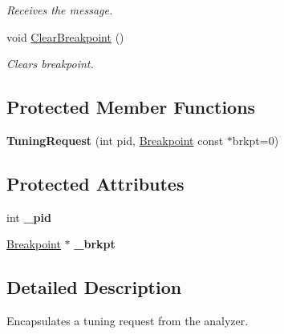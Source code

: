 \begin{DoxyCompactItemize}
\begin{DoxyCompactList}\small\item\em Receives the message. \end{DoxyCompactList}\item 
\hypertarget{class_common_1_1_tuning_request_a8a83c67314d30a6b78fd7510219c3a01}{void \hyperlink{class_common_1_1_tuning_request_a8a83c67314d30a6b78fd7510219c3a01}{Clear\-Breakpoint} ()}\label{class_common_1_1_tuning_request_a8a83c67314d30a6b78fd7510219c3a01}

\begin{DoxyCompactList}\small\item\em Clears breakpoint. \end{DoxyCompactList}\end{DoxyCompactItemize}
\subsection*{Protected Member Functions}
\begin{DoxyCompactItemize}
\item 
\hypertarget{class_common_1_1_tuning_request_a77112081462dd30e0dc053a6c1d58eb4}{{\bfseries Tuning\-Request} (int pid, \hyperlink{class_common_1_1_breakpoint}{Breakpoint} const $\ast$brkpt=0)}\label{class_common_1_1_tuning_request_a77112081462dd30e0dc053a6c1d58eb4}

\end{DoxyCompactItemize}
\subsection*{Protected Attributes}
\begin{DoxyCompactItemize}
\item 
\hypertarget{class_common_1_1_tuning_request_a706eb2eae0198721cf0d6147ad379f34}{int {\bfseries \-\_\-pid}}\label{class_common_1_1_tuning_request_a706eb2eae0198721cf0d6147ad379f34}

\item 
\hypertarget{class_common_1_1_tuning_request_a3ed959da237f66730d29348b251f8c28}{\hyperlink{class_common_1_1_breakpoint}{Breakpoint} $\ast$ {\bfseries \-\_\-brkpt}}\label{class_common_1_1_tuning_request_a3ed959da237f66730d29348b251f8c28}

\end{DoxyCompactItemize}


\subsection{Detailed Description}
Encapsulates a tuning request from the analyzer. 

